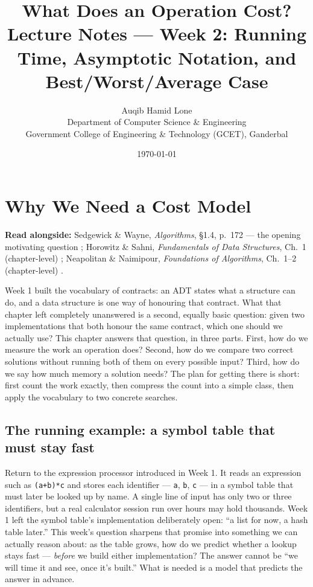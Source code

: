 \documentclass[11pt]{article}
\title{What Does an Operation Cost?\\\large Lecture Notes --- Week 2: Running Time, Asymptotic Notation, and Best/Worst/Average Case}
\author{Auqib Hamid Lone\\[0.3em]
  \small Department of Computer Science \& Engineering\\
  \small Government College of Engineering \& Technology (GCET), Ganderbal}
\date{\today}
\begin{document}
\maketitle

\section{Why We Need a Cost Model}
\label{sec:motivation}

\textbf{Read alongside:} Sedgewick \& Wayne, \textit{Algorithms}, \S1.4, p.~172 --- the opening motivating question \cite{Sedgewick2011_algorithms}; Horowitz \& Sahni, \textit{Fundamentals of Data Structures}, Ch.~1 (chapter-level) \cite{HorowitzSahni2008_fundamentals_data_structures}; Neapolitan \& Naimipour, \textit{Foundations of Algorithms}, Ch.~1--2 (chapter-level) \cite{Neapolitan2010_foundations_of_algorithms}.

Week 1 built the vocabulary of contracts: an ADT states what a structure can
do, and a data structure is one way of honouring that contract. What that
chapter left completely unanswered is a second, equally basic question: given
two implementations that both honour the same contract, which one should we
actually use? This chapter answers that question, in three parts. First, how
do we measure the work an operation does? Second, how do we compare two
correct solutions without running both of them on every possible input?
Third, how do we say how much memory a solution needs? The plan for getting
there is short: first count the work exactly, then compress the count into a
simple class, then apply the vocabulary to two concrete searches.

\subsection{The running example: a symbol table that must stay fast}

Return to the expression processor introduced in Week 1. It reads an
expression such as \texttt{(a+b)*c} and stores each identifier ---
\texttt{a}, \texttt{b}, \texttt{c} --- in a symbol table that must later be
looked up by name. A single line of input has only two or three identifiers,
but a real calculator session run over hours may hold thousands. Week 1 left
the symbol table's implementation deliberately open: ``a list for now, a hash
table later.'' This week's question sharpens that promise into something we
can actually reason about: as the table grows, how do we predict whether a
lookup stays fast --- \emph{before} we build either implementation? The
answer cannot be ``we will time it and see, once it's built.'' What is
needed is a model that predicts the answer in advance.
\end{document}
